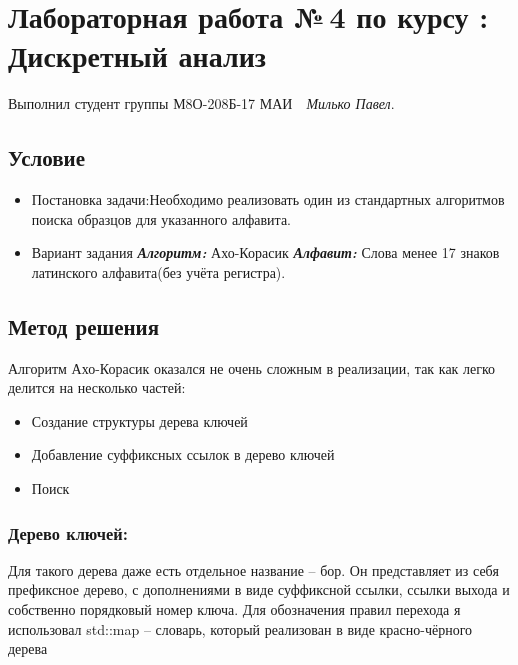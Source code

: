 \documentclass[12pt]{article}
\begin{document}
\section*{\centering Лабораторная работа №\,4 по курсу :\\ Дискретный анализ}

Выполнил студент группы М8О-208Б-17 МАИ \,\, \textit{Милько Павел}.

\subsection*{Условие}

\begin{itemize}
    \item Постановка задачи:\subitem Необходимо реализовать один из стандартных алгоритмов поиска образцов для указанного алфавита.
    
    \item Вариант задания 
    \subitem \textit{\textbf{Алгоритм:}} Ахо-Корасик 
    \subitem \textit{\textbf{Алфавит:}}  Слова менее 17 знаков латинского алфавита(без учёта регистра).
    
\end{itemize}

\subsection*{Метод решения}

Алгоритм Ахо-Корасик оказался не очень сложным в реализации, так как легко делится на несколько частей:

\begin{itemize}
\item Создание структуры дерева ключей
\item Добавление суффиксных ссылок в дерево ключей
\item Поиск
\end{itemize}

\subsubsection*{Дерево ключей:}

Для такого дерева даже есть отдельное название -- бор. Он представляет из себя префиксное дерево, с дополнениями в виде суффиксной ссылки, ссылки выхода и собственно порядковый номер ключа. Для обозначения правил перехода я использовал std::map -- словарь, который реализован в виде красно-чёрного дерева
\end{document}

